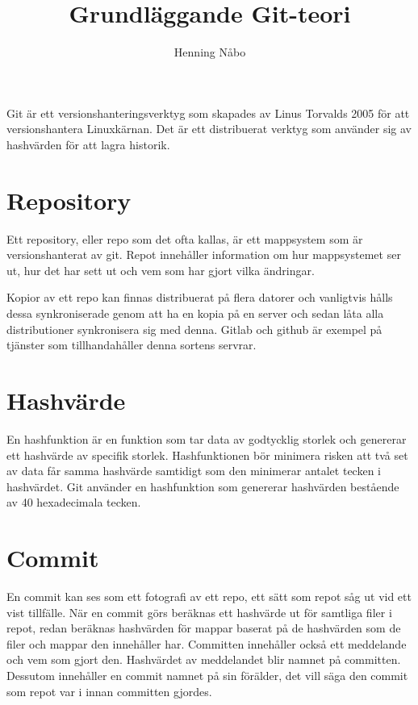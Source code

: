 \documentclass[a4paper,12pt]{article}
\author{Henning Nåbo}
\title{Grundläggande Git-teori}
\begin{document}
\maketitle

Git är ett versionshanteringsverktyg som skapades av Linus Torvalds 2005 för att versionshantera Linuxkärnan.
Det är ett distribuerat verktyg som använder sig av hashvärden för att lagra historik.

\section{Repository}

Ett repository, eller repo som det ofta kallas, är ett mappsystem som är versionshanterat av git. 
Repot innehåller information om hur mappsystemet ser ut, hur det har sett ut och vem som har gjort vilka ändringar.

Kopior av ett repo kan finnas distribuerat på flera datorer och vanligtvis hålls dessa synkroniserade genom att ha en kopia på en server och sedan låta alla distributioner synkronisera sig med denna.
Gitlab och github är exempel på tjänster som tillhandahåller denna sortens servrar.

\section{Hashvärde}

En hashfunktion är en funktion som tar data av godtycklig storlek och genererar ett hashvärde av specifik storlek.
Hashfunktionen bör minimera risken att två set av data får samma hashvärde samtidigt som den minimerar antalet tecken i hashvärdet.
Git använder en hashfunktion som genererar hashvärden bestående av 40 hexadecimala tecken.

\section{Commit}

En commit kan ses som ett fotografi av ett repo, ett sätt som repot såg ut vid ett vist tillfälle.
När en commit görs beräknas ett hashvärde ut för samtliga filer i repot, redan beräknas hashvärden för mappar baserat på de hashvärden som de filer och mappar den innehåller har.
Committen innehåller också ett meddelande och vem som gjort den. 
Hashvärdet av meddelandet blir namnet på committen.
Dessutom innehåller en commit namnet på sin förälder, det vill säga den commit som repot var i innan committen gjordes.
\end{document}
